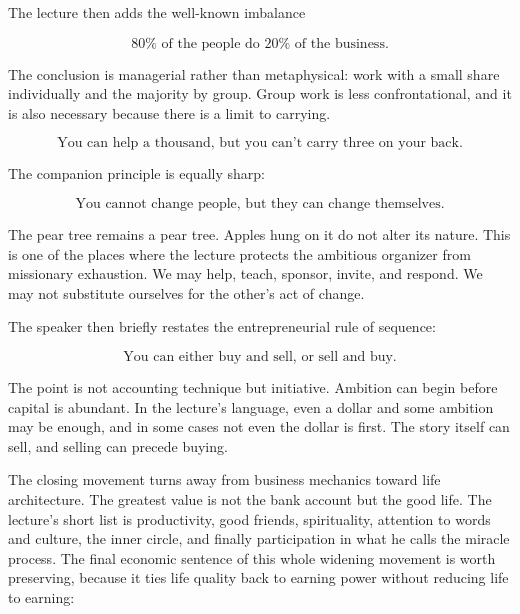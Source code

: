 The lecture then adds the well-known imbalance

\begin{equation}
80\% \text{ of the people do } 20\% \text{ of the business.}
\end{equation}

The conclusion is managerial rather than metaphysical: work with a small share individually and the majority by group. Group work is less confrontational, and it is also necessary because there is a limit to carrying.

\begin{equation}
\text{You can help a thousand, but you can't carry three on your back.}
\end{equation}

The companion principle is equally sharp:

\begin{equation}
\text{You cannot change people, but they can change themselves.}
\end{equation}

The pear tree remains a pear tree. Apples hung on it do not alter its nature. This is one of the places where the lecture protects the ambitious organizer from missionary exhaustion. We may help, teach, sponsor, invite, and respond. We may not substitute ourselves for the other's act of change.

The speaker then briefly restates the entrepreneurial rule of sequence:

\begin{equation}
\text{You can either buy and sell, or sell and buy.}
\end{equation}

The point is not accounting technique but initiative. Ambition can begin before capital is abundant. In the lecture's language, even a dollar and some ambition may be enough, and in some cases not even the dollar is first. The story itself can sell, and selling can precede buying.

The closing movement turns away from business mechanics toward life architecture. The greatest value is not the bank account but the good life. The lecture's short list is productivity, good friends, spirituality, attention to words and culture, the inner circle, and finally participation in what he calls the miracle process. The final economic sentence of this whole widening movement is worth preserving, because it ties life quality back to earning power without reducing life to earning:

